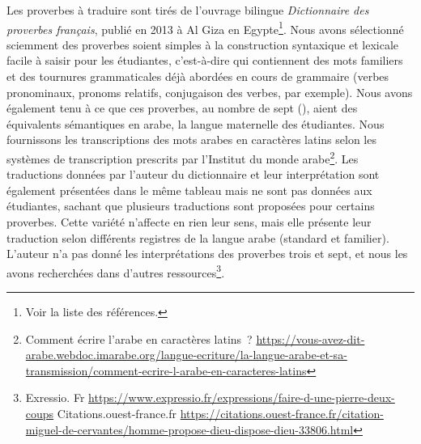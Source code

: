 \documentclass[french]{textolivre}
\begin{document}
Les proverbes à traduire sont tirés de l’ouvrage bilingue \textit{Dictionnaire des proverbes français}, publié en 2013 à Al Giza en Egypte\footnote{Voir la liste des références.}.%
Nous avons sélectionné sciemment des proverbes soient simples à la construction syntaxique et lexicale facile à saisir pour les étudiantes, c’est-à-dire qui contiennent des mots familiers et des tournures grammaticales déjà abordées en cours de grammaire (verbes pronominaux, pronoms relatifs, conjugaison des verbes, par exemple). Nous avons également tenu à ce que ces proverbes, au nombre de sept (), aient des équivalents sémantiques en arabe, la langue maternelle des étudiantes. Nous fournissons les transcriptions des mots arabes en caractères latins selon les systèmes de transcription prescrits par l’Institut du monde arabe\footnote{Comment écrire l’arabe en caractères latins ? \url{https://vous-avez-dit-arabe.webdoc.imarabe.org/langue-ecriture/la-langue-arabe-et-sa-transmission/comment-ecrire-l-arabe-en-caracteres-latins}}. Les traductions données par l’auteur du dictionnaire et leur interprétation sont également présentées dans le même tableau mais ne sont pas données aux étudiantes, sachant que plusieurs traductions sont proposées pour certains proverbes. Cette variété n’affecte en rien leur sens, mais elle présente leur traduction selon différents registres de la langue arabe (standard et familier). L’auteur n’a pas donné les interprétations des proverbes trois et sept, et nous les avons recherchées dans d’autres ressources\footnote{Exressio. Fr \url{https://www.expressio.fr/expressions/faire-d-une-pierre-deux-coups} Citations.ouest-france.fr \url{https://citations.ouest-france.fr/citation-miguel-de-cervantes/homme-propose-dieu-dispose-dieu-33806.html}}. 
\end{document}
